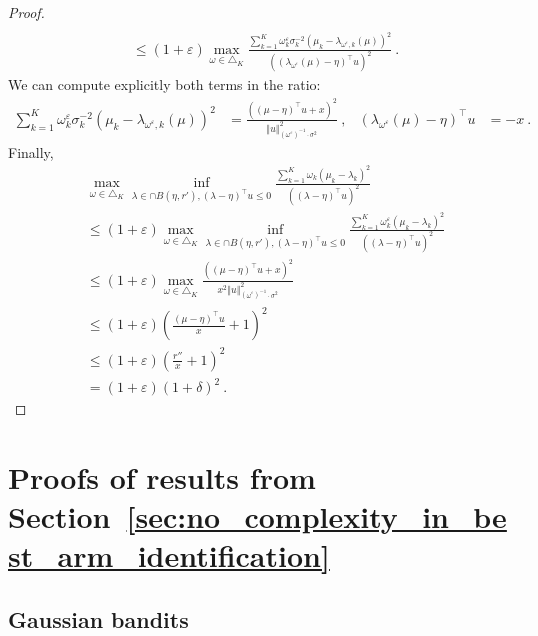 \documentclass{article}
\begin{document}
\begin{proof}
\begin{align*}
\\
&\le (1 + \varepsilon) \max_{\omega \in \triangle_K} 
  \frac{\sum_{k=1}^K \omega_{k}^\varepsilon \sigma_k^{-2} (\mu_k - \lambda_{\omega^\varepsilon,k}(\mu))^2}{((\lambda_{\omega^\varepsilon}(\mu) - \eta)^\top u)^2}
\: .
\end{align*}
We can compute explicitly both terms in the ratio:
\begin{align*}
\sum_{k=1}^K \omega_{k}^\varepsilon \sigma_k^{-2} (\mu_k - \lambda_{\omega^\varepsilon,k}(\mu))^2
&= \frac{((\mu - \eta)^\top u + x)^2}{\Vert u \Vert^2_{(\omega^\varepsilon)^{-1} \cdot \sigma^{2}}}
\: ,
&
(\lambda_{\omega^\varepsilon}(\mu) - \eta)^\top u
&= -x
\: .
\end{align*}
Finally,
\begin{align*}
&\max_{\omega \in \triangle_K} \inf_{\lambda \in \cap B(\eta, r'), (\lambda - \eta)^\top u \le 0}
  \frac{\sum_{k=1}^K \omega_{k} (\mu_k - \lambda_k)^2}{((\lambda - \eta)^\top u)^2}
\\
&\le (1 + \varepsilon) \max_{\omega \in \triangle_K} \inf_{\lambda \in \cap B(\eta, r'), (\lambda - \eta)^\top u \le 0}
  \frac{\sum_{k=1}^K \omega_{k}^\varepsilon (\mu_k - \lambda_k)^2}{((\lambda - \eta)^\top u)^2}
\\
&\le (1 + \varepsilon) \max_{\omega \in \triangle_K}
  \frac{((\mu - \eta)^\top u + x)^2}{x^2 \Vert u \Vert^2_{(\omega^\varepsilon)^{-1} \cdot \sigma^{2}}}
\\
&\le (1 + \varepsilon) (\frac{(\mu - \eta)^\top u}{x} + 1)^2
\\
&\le (1 + \varepsilon) (\frac{r''}{x} + 1)^2
\\
&= (1 + \varepsilon) (1 + \delta)^2
\: .
\end{align*}
\end{proof}


\section{Proofs of results from Section~\ref{sec:no_complexity_in_best_arm_identification}}
\label{sec:proofs_relative_to_section_sec:no_complexity_in_best_arm_identification}

\subsection{Gaussian bandits}
\label{sub:gaussian_bai_proof}
\end{document}
